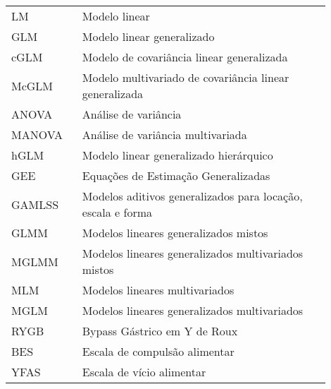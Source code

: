 

\begin{listaacron}

\begin{longtable}[l]{p{0.2\linewidth}p{0.7\linewidth}}

LM & Modelo linear\\
GLM & Modelo linear generalizado\\
cGLM & Modelo de covariância linear generalizada\\
McGLM & Modelo multivariado de covariância linear generalizada\\
ANOVA & Análise de variância\\
MANOVA & Análise de variância multivariada\\
hGLM & Modelo linear generalizado hierárquico\\
GEE & Equações de Estimação Generalizadas\\
GAMLSS & Modelos aditivos generalizados para locação, escala e forma\\
GLMM & Modelos lineares generalizados mistos\\
MGLMM & Modelos lineares generalizados multivariados mistos\\
MLM & Modelos lineares multivariados\\
MGLM & Modelos lineares generalizados multivariados\\
RYGB & Bypass Gástrico em Y de Roux\\
BES & Escala de compulsão alimentar\\
YFAS & Escala de vício alimentar\\


\end{longtable}

\end{listaacron}

